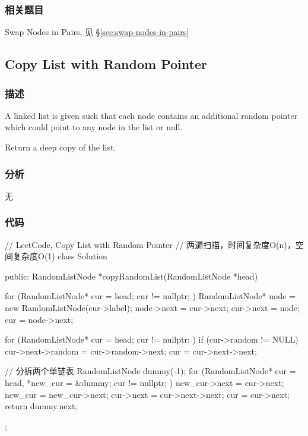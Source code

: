 \subsubsection{相关题目}
\begindot
\item Swap Nodes in Pairs, 见 \S \ref{sec:swap-nodes-in-pairs}
\myenddot


\subsection{Copy List with Random Pointer}
\label{sec:copy-list-with-random-pointer}


\subsubsection{描述}
A linked list is given such that each node contains an additional random pointer which could point to any node in the list or null.

Return a deep copy of the list.


\subsubsection{分析}
无


\subsubsection{代码}
\begin{Code}
// LeetCode, Copy List with Random Pointer
// 两遍扫描，时间复杂度O(n)，空间复杂度O(1)
class Solution {
public:
    RandomListNode *copyRandomList(RandomListNode *head) {
        for (RandomListNode* cur = head; cur != nullptr; ) {
            RandomListNode* node = new RandomListNode(cur->label);
            node->next = cur->next;
            cur->next = node;
            cur = node->next;
        }

        for (RandomListNode* cur = head; cur != nullptr; ) {
            if (cur->random != NULL)
                cur->next->random = cur->random->next;
            cur = cur->next->next;
        }

        // 分拆两个单链表
        RandomListNode dummy(-1);
        for (RandomListNode* cur = head, *new_cur = &dummy;
                cur != nullptr; ) {
            new_cur->next = cur->next;
            new_cur = new_cur->next;
            cur->next = cur->next->next;
            cur = cur->next;
        }
        return dummy.next;
    }
};
\end{Code}


